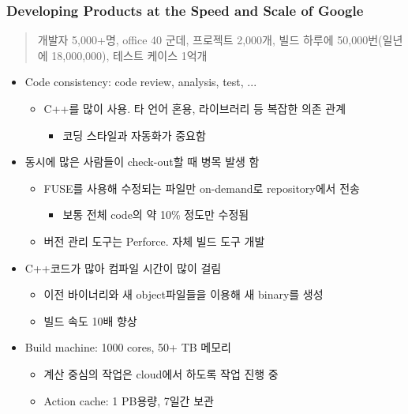 \begin{frame}
\frametitle{Developing Products at the Speed and Scale of Google}

\begin{quote}
개발자 5,000+명, office 40 군데, 프로젝트 2,000개, 빌드 하루에 50,000번(일년에 18,000,000), 테스트 케이스 1억개
\end{quote}

\begin{itemize}

\item Code consistency: code review, analysis, test, ...
    \begin{itemize}
    \item C++를 많이 사용. 타 언어 혼용, 라이브러리 등 복잡한 의존 관계
      \begin{itemize}
      \item 코딩 스타일과 자동화가 중요함
      \end{itemize}
    \end{itemize}

\item 동시에 많은 사람들이 check-out할 때 병목 발생 함
    \begin{itemize}
    \item FUSE를 사용해 수정되는 파일만 on-demand로 repository에서 전송 
         \begin{itemize}
         \item 보통 전체 code의 약  10\% 정도만 수정됨
         \end{itemize}
    \item 버전 관리 도구는 Perforce. 자체 빌드 도구 개발
    \end{itemize}
\item C++코드가 많아 컴파일 시간이 많이 걸림
    \begin{itemize}
    \item 이전 바이너리와 새 object파일들을 이용해 새 binary를 생성
    \item 빌드 속도 10배 향상
    \end{itemize}

\item Build machine: 1000 cores, 50+ TB 메모리
    \begin{itemize}
    \item 계산 중심의 작업은 cloud에서 하도록 작업 진행 중
    \item Action cache: 1 PB용량, 7일간 보관
    \end{itemize}
\end{itemize}


\end{frame}

